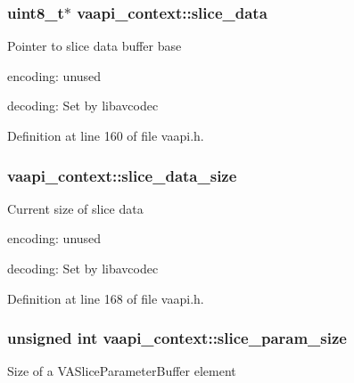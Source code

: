 \subsubsection[{\texorpdfstring{slice\+\_\+data}{slice_data}}]{ {\bf uint8\+\_\+t}$\ast$ vaapi\+\_\+context\+::slice\+\_\+data}\hypertarget{structvaapi__context_ac013038c1faa1cbaf0aa132ada52414c}{}\label{structvaapi__context_ac013038c1faa1cbaf0aa132ada52414c}
Pointer to slice data buffer base
\begin{DoxyItemize}
\item encoding\+: unused
\item decoding\+: Set by libavcodec 
\end{DoxyItemize}

Definition at line 160 of file vaapi.\+h.

\subsubsection[{\texorpdfstring{slice\+\_\+data\+\_\+size}{slice_data_size}}]{ vaapi\+\_\+context\+::slice\+\_\+data\+\_\+size}\hypertarget{structvaapi__context_ab2444cafb4a40251c026c73d049fe84a}{}\label{structvaapi__context_ab2444cafb4a40251c026c73d049fe84a}
Current size of slice data


\begin{DoxyItemize}
\item encoding\+: unused
\item decoding\+: Set by libavcodec 
\end{DoxyItemize}

Definition at line 168 of file vaapi.\+h.

\subsubsection[{\texorpdfstring{slice\+\_\+param\+\_\+size}{slice_param_size}}]{\setlength{\rightskip}{0pt plus 5cm}unsigned {\bf int} vaapi\+\_\+context\+::slice\+\_\+param\+\_\+size}\hypertarget{structvaapi__context_a0bad2e1063982d9c1c28964fb0cf402b}{}\label{structvaapi__context_a0bad2e1063982d9c1c28964fb0cf402b}
Size of a V\+A\+Slice\+Parameter\+Buffer element


